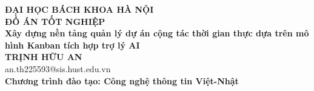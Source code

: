 \documentclass[DoAn.tex]{subfiles}
\begin{document}
\begin{titlepage}
\thispagestyle{empty}
\begin{center}

{\textbf{\large{ĐẠI HỌC BÁCH KHOA HÀ NỘI}}}\\[3cm]

{\textbf{\huge{ ĐỒ ÁN TỐT NGHIỆP}}}\\[1cm]
{\textbf{\Large{Xây dựng nền tảng quản lý dự án cộng tác thời gian thực dựa trên mô hình Kanban tích hợp trợ lý AI}}}\\[1cm]

{\textbf{\large{TRỊNH HỮU AN}}}\\
{\large{an.th225593@sis.hust.edu.vn}}\\[0.5cm]

{\textbf{\large{Chương trình đào tạo: Công nghệ thông tin Việt-Nhật}}}\\

\vspace{4cm}
\begin{table}[H]
\centering
{}
\end{table}
\end{center}

\end{titlepage}
\end{document}
